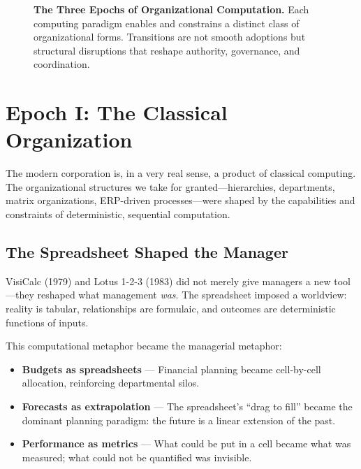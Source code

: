 \documentclass[11pt,a4paper,twocolumn]{article}
\begin{document}
\begin{figure}[t]
{%
}
\caption{\textbf{The Three Epochs of Organizational Computation.} Each computing paradigm enables and constrains a distinct class of organizational forms. Transitions are not smooth adoptions but structural disruptions that reshape authority, governance, and coordination.}
\label{fig:three-epochs}
\end{figure}


\section{Epoch I: The Classical Organization}
\label{sec:epoch-classical}

The modern corporation is, in a very real sense, a product of classical computing. The organizational structures we take for granted---hierarchies, departments, matrix organizations, ERP-driven processes---were shaped by the capabilities and constraints of deterministic, sequential computation.

\subsection{The Spreadsheet Shaped the Manager}

VisiCalc (1979) and Lotus 1-2-3 (1983) did not merely give managers a new tool---they reshaped what management \textit{was}. The spreadsheet imposed a worldview: reality is tabular, relationships are formulaic, and outcomes are deterministic functions of inputs.

This computational metaphor became the managerial metaphor:
\begin{itemize}[leftmargin=1.5em]
  \item \textbf{Budgets as spreadsheets} --- Financial planning became cell-by-cell allocation, reinforcing departmental silos.
  \item \textbf{Forecasts as extrapolation} --- The spreadsheet's ``drag to fill'' became the dominant planning paradigm: the future is a linear extension of the past.
  \item \textbf{Performance as metrics} --- What could be put in a cell became what was measured; what could not be quantified was invisible.
\end{itemize}
\end{document}
